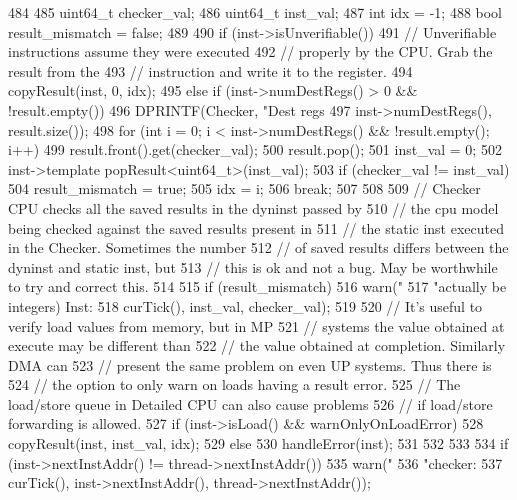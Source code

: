 \begin{DoxyCode}
484 {
485     uint64_t checker_val;
486     uint64_t inst_val;
487     int idx = -1;
488     bool result_mismatch = false;
489 
490     if (inst->isUnverifiable()) {
491         // Unverifiable instructions assume they were executed
492         // properly by the CPU. Grab the result from the
493         // instruction and write it to the register.
494         copyResult(inst, 0, idx);
495     } else if (inst->numDestRegs() > 0 && !result.empty()) {
496         DPRINTF(Checker, "Dest regs %
497                          inst->numDestRegs(), result.size());
498         for (int i = 0; i < inst->numDestRegs() && !result.empty(); i++) {
499             result.front().get(checker_val);
500             result.pop();
501             inst_val = 0;
502             inst->template popResult<uint64_t>(inst_val);
503             if (checker_val != inst_val) {
504                 result_mismatch = true;
505                 idx = i;
506                 break;
507             }
508         }
509     } // Checker CPU checks all the saved results in the dyninst passed by
510       // the cpu model being checked against the saved results present in
511       // the static inst executed in the Checker.  Sometimes the number
512       // of saved results differs between the dyninst and static inst, but
513       // this is ok and not a bug.  May be worthwhile to try and correct this.
514 
515     if (result_mismatch) {
516         warn("%
517              "actually be integers) Inst: %
518              curTick(), inst_val, checker_val);
519 
520         // It's useful to verify load values from memory, but in MP
521         // systems the value obtained at execute may be different than
522         // the value obtained at completion.  Similarly DMA can
523         // present the same problem on even UP systems.  Thus there is
524         // the option to only warn on loads having a result error.
525         // The load/store queue in Detailed CPU can also cause problems
526         // if load/store forwarding is allowed.
527         if (inst->isLoad() && warnOnlyOnLoadError) {
528             copyResult(inst, inst_val, idx);
529         } else {
530             handleError(inst);
531         }
532     }
533 
534     if (inst->nextInstAddr() != thread->nextInstAddr()) {
535         warn("%
536              "checker: %
537              curTick(), inst->nextInstAddr(), thread->nextInstAddr());
}}
\end{DoxyCode}
